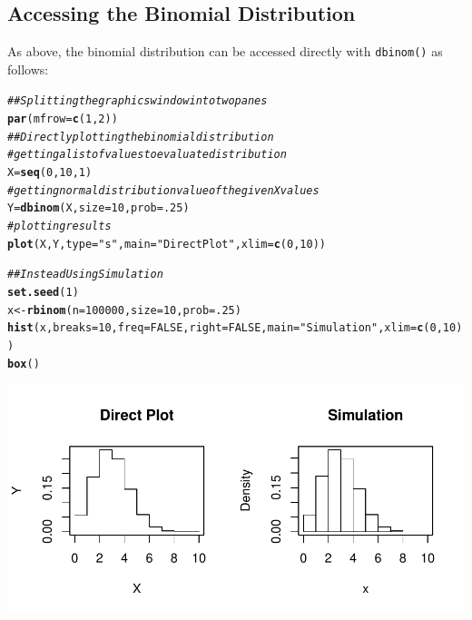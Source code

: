 \documentclass{report}\usepackage[]{graphicx}\usepackage[]{color}
\makeatletter
\def\maxwidth{ %
  \ifdim\Gin@nat@width>\linewidth
    \linewidth
  \else
    \Gin@nat@width
  \fi
}
\newcommand{\hlnum}[1]{\textcolor[rgb]{0.686,0.059,0.569}{#1}}%
\newcommand{\hlstr}[1]{\textcolor[rgb]{0.192,0.494,0.8}{#1}}%
\newcommand{\hlcom}[1]{\textcolor[rgb]{0.678,0.584,0.686}{\textit{#1}}}%
\newcommand{\hlstd}[1]{\textcolor[rgb]{0.345,0.345,0.345}{#1}}%
\newcommand{\hlkwb}[1]{\textcolor[rgb]{0.69,0.353,0.396}{#1}}%
\newcommand{\hlkwc}[1]{\textcolor[rgb]{0.333,0.667,0.333}{#1}}%
\newcommand{\hlkwd}[1]{\textcolor[rgb]{0.737,0.353,0.396}{\textbf{#1}}}%
\newenvironment{kframe}{%
 \def\at@end@of@kframe{}%
 \ifinner\ifhmode%
  \def\at@end@of@kframe{\end{minipage}}%
  \begin{minipage}{\columnwidth}%
 \fi\fi%
 \def\FrameCommand##1{\hskip\@totalleftmargin \hskip-\fboxsep
 \colorbox{shadecolor}{##1}\hskip-\fboxsep
     \hskip-\linewidth \hskip-\@totalleftmargin \hskip\columnwidth}%
 \MakeFramed {\advance\hsize-\width
   \@totalleftmargin\z@ \linewidth\hsize
   \@setminipage}}%
 {\par\unskip\endMakeFramed%
 \at@end@of@kframe}
\newenvironment{knitrout}{}{} %
\makeatother
\begin{document}
\subsection{Accessing the Binomial Distribution}
As above, the binomial distribution can be accessed directly with \texttt{dbinom()} as follows: 
\begin{knitrout}
\color{fgcolor}\begin{kframe}
\begin{alltt}
\hlcom{## Splitting the graphics window into two panes }
\hlkwd{par}\hlstd{(}\hlkwc{mfrow}\hlstd{=}\hlkwd{c}\hlstd{(}\hlnum{1}\hlstd{,}\hlnum{2}\hlstd{))}
\hlcom{## Directly plotting the binomial distribution}
 \hlcom{# getting a list of values to evaluate distribution}
\hlstd{X} \hlkwb{=} \hlkwd{seq}\hlstd{(}\hlnum{0}\hlstd{,} \hlnum{10}\hlstd{,} \hlnum{1}\hlstd{)}
 \hlcom{# getting normal distribution value of the given X values }
\hlstd{Y} \hlkwb{=} \hlkwd{dbinom}\hlstd{(X,} \hlkwc{size} \hlstd{=} \hlnum{10}\hlstd{,} \hlkwc{prob} \hlstd{=} \hlnum{.25}\hlstd{)}
 \hlcom{# plotting results }
\hlkwd{plot}\hlstd{(X,Y,} \hlkwc{type} \hlstd{=} \hlstr{"s"}\hlstd{,} \hlkwc{main} \hlstd{=} \hlstr{"Direct Plot"}\hlstd{,} \hlkwc{xlim} \hlstd{=} \hlkwd{c}\hlstd{(}\hlnum{0}\hlstd{,}\hlnum{10}\hlstd{))}

\hlcom{## Instead Using Simulation}
\hlkwd{set.seed}\hlstd{(}\hlnum{1}\hlstd{)}
\hlstd{x} \hlkwb{<-} \hlkwd{rbinom}\hlstd{(}\hlkwc{n} \hlstd{=} \hlnum{100000}\hlstd{,} \hlkwc{size} \hlstd{=} \hlnum{10}\hlstd{,} \hlkwc{prob} \hlstd{=} \hlnum{.25}\hlstd{)}
\hlkwd{hist}\hlstd{(x,} \hlkwc{breaks} \hlstd{=} \hlnum{10}\hlstd{,} \hlkwc{freq} \hlstd{=} \hlnum{FALSE}\hlstd{,}\hlkwc{right} \hlstd{=} \hlnum{FALSE}\hlstd{,} \hlkwc{main} \hlstd{=} \hlstr{"Simulation"}\hlstd{,} \hlkwc{xlim} \hlstd{=} \hlkwd{c}\hlstd{(}\hlnum{0}\hlstd{,}\hlnum{10}\hlstd{))}
\hlkwd{box}\hlstd{()}
\end{alltt}
\end{kframe}

{\centering \includegraphics[width=\maxwidth]{figure/unnamed-chunk-92-1} 

}



\end{knitrout}
\end{document}
